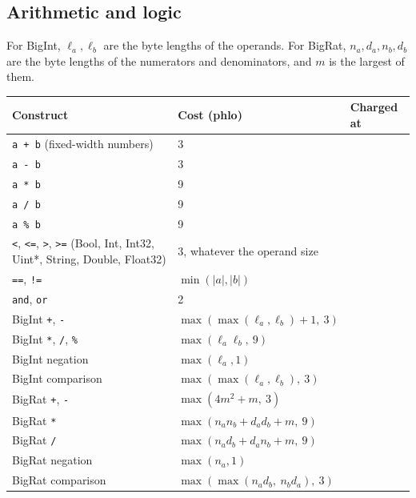 \subsection{Arithmetic and logic}

For BigInt, $\ell_a, \ell_b$ are the byte lengths of the operands. For BigRat, $n_a, d_a, n_b, d_b$ are the byte lengths of the numerators and denominators, and $m$ is the largest of them.

\begin{longtable}{@{}P{5.4cm}P{5.6cm}P{3.6cm}@{}}
\toprule
\textbf{Construct} & \textbf{Cost (phlo)} & \textbf{Charged at} \\
\midrule
\endhead
\texttt{a + b} (fixed-width numbers) & 3 &  \\
\texttt{a - b} & 3 &  \\
\texttt{a * b} & 9 &  \\
\texttt{a / b} & 9 &  \\
\texttt{a \% b} & 9 &  \\
\texttt{<}, \texttt{<=}, \texttt{>}, \texttt{>=} (Bool, Int, Int32, Uint*, String, Double, Float32) & 3, whatever the operand size &  \\
\texttt{==}, \texttt{!=} & $\min(|a|, |b|)$ &  \\
\texttt{and}, \texttt{or} & 2 &  \\
\midrule
BigInt \texttt{+}, \texttt{-} & $\max(\max(\ell_a,\ell_b)+1,\ 3)$ &  \\
BigInt \texttt{*}, \texttt{/}, \texttt{\%} & $\max(\ell_a \ell_b,\ 9)$ &  \\
BigInt negation & $\max(\ell_a, 1)$ &  \\
BigInt comparison & $\max(\max(\ell_a,\ell_b),\ 3)$ &  \\
\midrule
BigRat \texttt{+}, \texttt{-} & $\max(4m^2 + m,\ 3)$ &  \\
BigRat \texttt{*} & $\max(n_a n_b + d_a d_b + m,\ 9)$ &  \\
BigRat \texttt{/} & $\max(n_a d_b + d_a n_b + m,\ 9)$ &  \\
BigRat negation & $\max(n_a, 1)$ &  \\
BigRat comparison & $\max(\max(n_a d_b,\ n_b d_a),\ 3)$ &  \\
\bottomrule
\end{longtable}

